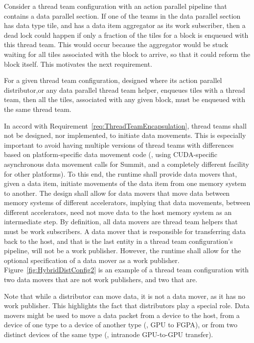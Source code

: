 \documentclass{article}
\begin{document}
Consider a thread team configuration with an action parallel pipeline that
contains a data parallel section.  If one of the teams in the data parallel
section has data type tile, and has a data item aggregator as its work
subscriber, then a dead lock could happen if only a fraction of the tiles for a
block is enqueued with this thread team.  This would occur because the
aggregator would be stuck waiting for all tiles associated with the block to
arrive, so that it could reform the block itself.  This motivates the next
requirement.

\begin{req}
For a given thread team configuration, designed where its action parallel
distributor,or any data parallel thread team helper, enqueues tiles with a thread
team, then all the tiles, associated with any given block, must be enqueued with
the same thread team.
\end{req}


\begin{req}
In accord with Requirement~\ref{req:ThreadTeamEncapsulation}, thread teams shall
not be designed, nor implemented, to initiate data movements.  This is especially
important to avoid having multiple versions of thread teams with differences
based on platform-specific data movement code (\eg, using CUDA-specific
asynchronous data movement calls for Summit, and a completely different facility
for other platforms).  To this end, the runtime shall provide data movers that,
given a data item, initiate movements of the data item from one memory system to
another.  The design shall allow for data movers that move data between memory
systems of different accelerators, implying that data movements, between
different accelerators, need not move data to the host memory system as an
intermediate step.  By definition, all data movers are thread team helpers that
must be work subscribers.  A data mover that is responsible for transferring
data back to the host, and that is the last entity in a thread team
configuration's pipeline, will not be a work publisher.
However, the runtime shall allow for the optional specification of a data mover
as a work publisher.  Figure~\ref{fig:HybridDistConfig2} is an example of a
thread team configuration with two data movers that are not work publishers, and
two that are.
\end{req}

Note that while a distributor can move data, it is not a data mover, as it
has no work publisher.  This highlights the fact that distributors play a
special role.  Data movers might be used to move a data packet from a device to
the host, from a device of one type to a device of another type (\eg, GPU to
FGPA), or from two distinct devices of the same type (\eg, intranode GPU-to-GPU
transfer).
\end{document}
